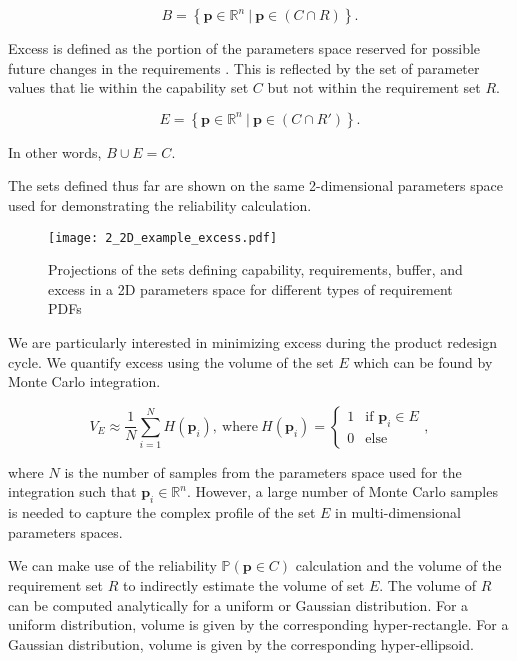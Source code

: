 \begin{equation} \label{eq:buffer}
	\textit{B} = \left\{\mathbf{p} \in \mathbb{R}^n~|~\mathbf{p} \in \left(C\cap R\right) \right\}.
\end{equation}

Excess is defined as the portion of the parameters space reserved for possible future changes in the requirements \cite{Eckert2019}. This is reflected by the set of parameter values that lie within the capability set $C$ but not within the requirement set $R$. 

\begin{equation} \label{eq:excess}
	\textit{E} = \left\{\mathbf{p} \in \mathbb{R}^n~|~\mathbf{p} \in \left(C\cap R'\right) \right\}.
\end{equation}

In other words, $B\cup E = C$.

The sets defined thus far are shown on the same 2-dimensional parameters space used for demonstrating the reliability calculation.

\begin{figure}[h!]
	\centering
	\texttt{[image: 2\_2D\_example\_excess.pdf]}
	\caption{Projections of the sets defining capability, requirements, buffer, and excess in a 2D parameters space for different types of requirement \acp{PDF}}
	\label{fig:2Dexampleexcess}
\end{figure}

We are particularly interested in minimizing excess during the product redesign cycle. We quantify excess using the volume of the set $E$ which can be found by Monte Carlo integration.

\begin{equation} \label{eq:excessmontecarlo}
	V_E \approx \dfrac{1}{N} {\sum\limits_{i=1}^{N} H\left(\mathbf{p}_i\right)}, ~\mathrm{where}~ H\left(\mathbf{p}_i\right)={\begin{cases}1&{\text{if }}\mathbf{p}_i\in E\\0&{\text{else}}\end{cases}},
\end{equation}

where $N$ is the number of samples from the parameters space used for the integration such that $\mathbf{p}_i \in \mathbb{R}^n$. However, a large number of Monte Carlo samples is needed to capture the complex profile of the set $E$ in multi-dimensional parameters spaces.

We can make use of the reliability $\mathbb{P}(\mathbf{p} \in C)$ calculation and the volume of the requirement set $R$ to indirectly estimate the volume of set $E$. The volume of $R$ can be computed analytically for a uniform or Gaussian distribution. For a uniform distribution, volume is given by the corresponding hyper-rectangle. For a Gaussian distribution, volume is given by the corresponding hyper-ellipsoid.

